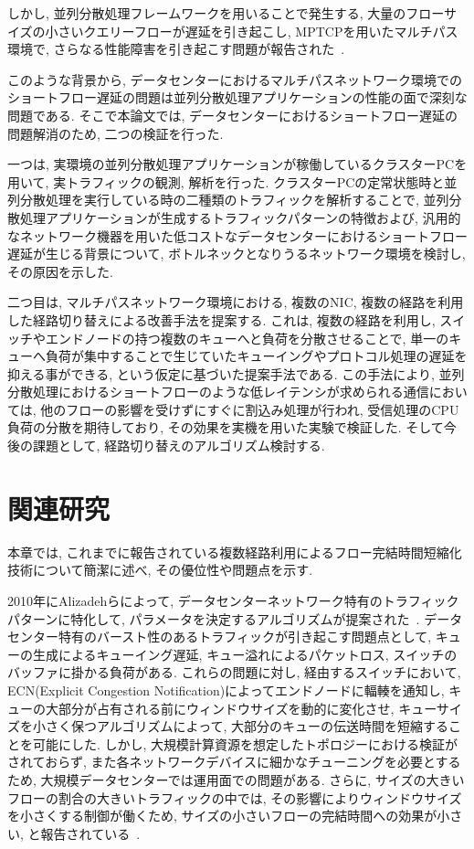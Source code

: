 \documentclass[11pt, a4paper, twocolumn]{jsarticle}
\begin{document}
しかし, 並列分散処理フレームワークを用いることで発生する, 大量のフローサイズの小さいクエリーフローが遅延を引き起こし,
MPTCPを用いたマルチパス環境で, さらなる性能障害を引き起こす問題が報告された~\cite{improving, rtt}.

このような背景から,
データセンターにおけるマルチパスネットワーク環境でのショートフロー遅延の問題は並列分散処理アプリケーションの性能の面で深刻な問題である.
そこで本論文では, データセンターにおけるショートフロー遅延の問題解消のため, 二つの検証を行った.

一つは, 実環境の並列分散処理アプリケーションが稼働しているクラスターPCを用いて, 実トラフィックの観測, 解析を行った.
クラスターPCの定常状態時と並列分散処理を実行している時の二種類のトラフィックを解析することで,
並列分散処理アプリケーションが生成するトラフィックパターンの特徴および, 汎用的なネットワーク機器を用いた低コストなデータセンターにおけるショートフロー遅延が生じる背景について, ボトルネックとなりうるネットワーク環境を検討し, その原因を示した.

二つ目は, マルチパスネットワーク環境における, 複数のNIC, 複数の経路を利用した経路切り替えによる改善手法を提案する.
これは, 複数の経路を利用し, スイッチやエンドノードの持つ複数のキューへと負荷を分散させることで, 単一のキューへ負荷が集中することで生じていたキューイングやプロトコル処理の遅延を抑える事ができる, という仮定に基づいた提案手法である.
この手法により, 並列分散処理におけるショートフローのような低レイテンシが求められる通信においては, 他のフローの影響を受けずにすぐに割込み処理が行われ,
受信処理のCPU負荷の分散を期待しており, その効果を実機を用いた実験で検証した.
そして今後の課題として, 経路切り替えのアルゴリズム検討する.


\section{関連研究}
\label{sec:related}
本章では, これまでに報告されている複数経路利用によるフロー完結時間短縮化技術について簡潔に述べ, その優位性や問題点を示す.

2010年にAlizadehらによって, データセンターネットワーク特有のトラフィックパターンに特化して,
パラメータを決定するアルゴリズムが提案された~\cite{dctcp}.
データセンター特有のバースト性のあるトラフィックが引き起こす問題点として, キューの生成によるキューイング遅延, キュー溢れによるパケットロス,
スイッチのバッファに掛かる負荷がある.
これらの問題に対し, 経由するスイッチにおいて, ECN(Explicit Congestion Notification)によってエンドノードに輻輳を通知し,
キューの大部分が占有される前にウィンドウサイズを動的に変化させ, キューサイズを小さく保つアルゴリズムによって,
大部分のキューの伝送時間を短縮することを可能にした.
しかし, 大規模計算資源を想定したトポロジーにおける検証がされておらず, また各ネットワークデバイスに細かなチューニングを必要とするため,
大規模データセンターでは運用面での問題がある.
さらに, サイズの大きいフローの割合の大きいトラフィックの中では, その影響によりウィンドウサイズを小さくする制御が働くため,
サイズの小さいフローの完結時間への効果が小さい, と報告されている~\cite{p_fab}.
\end{document}
